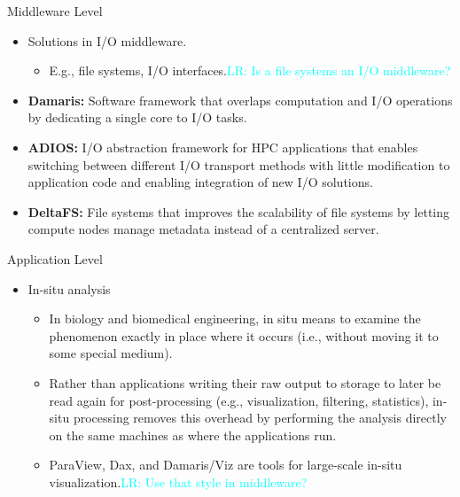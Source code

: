 \documentclass[compress,11pt,xcolor=svgnames,aspectratio=169]{beamer}
\newcommand{\lr}[1]{\textcolor{cyan}{LR: #1}}
\begin{document}
\begin{frame}[t]{Middleware Level}

\begin{itemize}
\setlength\itemsep{0.4cm}

\item Solutions in I/O middleware.

    \begin{itemize}

    \item E.g., file systems, I/O interfaces.\lr{Is a file systems an I/O middleware?}

    \end{itemize}

\item \textbf{Damaris:} Software framework that overlaps computation and I/O operations by dedicating a single core to I/O tasks.

\item \textbf{ADIOS:} I/O abstraction framework for HPC applications that enables switching between different I/O transport methods with little modification to application code and enabling integration of new I/O solutions.

\item \textbf{DeltaFS:} File systems that improves the scalability of file systems by letting compute nodes manage metadata instead of a centralized server.

\end{itemize}

\nocite{3372390}

\end{frame}

\begin{frame}[t]{Application Level}

\begin{itemize}

\item In-situ analysis\\[0.4cm]

    \begin{itemize}
    \setlength\itemsep{0.6cm}

    \item In biology and biomedical engineering, in situ means to examine the phenomenon exactly in place where it occurs (i.e., without moving it to some special medium).

    \item Rather than applications writing their raw output to storage to later be read again for post-processing (e.g., visualization, filtering, statistics), in-situ processing removes this overhead by performing the analysis directly on the same machines as where the applications run.

    \item ParaView, Dax, and Damaris/Viz are tools for large-scale in-situ visualization.\lr{Use that style in middleware?}

    \end{itemize}

\end{itemize}

\nocite{3372390}

\end{frame}
\end{document}
